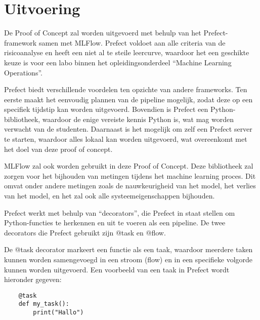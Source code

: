 \section{Uitvoering}


De Proof of Concept zal worden uitgevoerd met behulp van het Prefect-framework samen met MLFlow. Prefect voldoet aan alle criteria van de risicoanalyse en heeft een niet al te steile leercurve, waardoor het een geschikte keuze is voor een labo binnen het opleidingsonderdeel ``Machine Learning Operations''.

Prefect biedt verschillende voordelen ten opzichte van andere frameworks. Ten eerste maakt het eenvoudig plannen van de pipeline mogelijk, zodat deze op een specifiek tijdstip kan worden uitgevoerd. Bovendien is Prefect een Python-bibliotheek, waardoor de enige vereiste kennis Python is, wat mag worden verwacht van de studenten. Daarnaast is het mogelijk om zelf een Prefect server te starten, waardoor alles lokaal kan worden uitgevoerd, wat overeenkomt met het doel van deze proof of concept.

MLFlow zal ook worden gebruikt in deze Proof of Concept. Deze bibliotheek zal zorgen voor het bijhouden van metingen tijdens het machine learning proces. Dit omvat onder andere metingen zoals de nauwkeurigheid van het model, het verlies van het model, en het zal ook alle systeemeigenschappen bijhouden.

Prefect werkt met behulp van ``decorators'', die Prefect in staat stellen om Python-functies te herkennen en uit te voeren als een pipeline. De twee decorators die Prefect gebruikt zijn @task en @flow.

De @task decorator markeert een functie als een taak, waardoor meerdere taken kunnen worden samengevoegd in een stroom (flow) en in een specifieke volgorde kunnen worden uitgevoerd. Een voorbeeld van een taak in Prefect wordt hieronder gegeven:
\begin{verbatim}
    @task
    def my_task():
        print("Hallo")
\end{verbatim}

